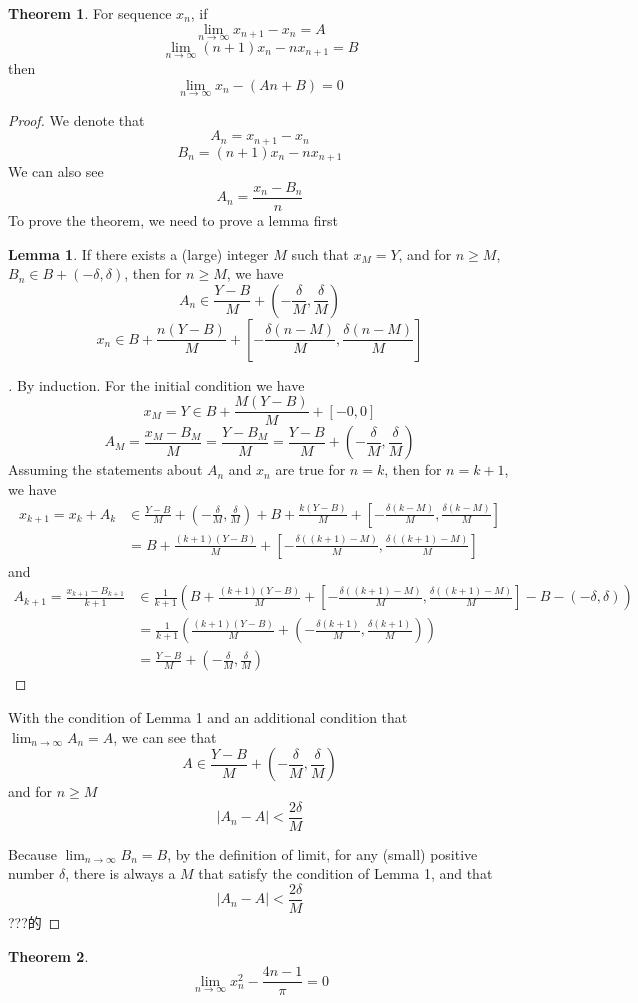 \documentclass[]{article}
\theoremstyle{definition}\newtheorem{theorem}{Theorem}
\theoremstyle{definition}\newtheorem{lemma}{Lemma}
\newenvironment{subproof}[1][\proofname]{%
  \renewcommand{\qedsymbol}{$\blacksquare$}%
  \begin{proof}[#1]%
}{%
  \end{proof}%
}
\begin{document}
\begin{theorem}
For sequence ${x_n}$, if
\[
\lim_{n\to\infty} x_{n+1} - x_n = A
\]
\[
\lim_{n\to\infty} (n+1)x_n - nx_{n+1} = B
\]
then
\[
\lim_{n\to\infty} x_n - (An+B) = 0
\]
\end{theorem}
\begin{proof}
We denote that
\[
A_n = x_{n+1} - x_n
\]
\[
B_n = (n+1)x_n - nx_{n+1}
\]
We can also see 
\[
A_n = \frac{x_n - B_n}{n}
\]
To prove the theorem, we need to prove a lemma first
\begin{lemma}
If there exists a (large) integer $M$ such that $x_M = Y$, and for $n\geq M$, $B_n \in B + (-\delta, \delta)$, then for $n\geq M$, we have
\[
A_n \in \frac{Y - B}{M} + \left(-\frac{\delta}{M}, \frac{\delta}{M}\right)
\]
\[
x_n \in B + \frac{n(Y - B)}{M} + \left[-\frac{\delta(n-M)}{M}, \frac{\delta(n-M)}{M}\right]
\]
\end{lemma}
\begin{subproof}
By induction. For the initial condition we have
\[
x_M = Y \in B + \frac{M(Y - B)}{M} + \left[-0, 0\right]
\]
\[
A_M = \frac{x_M - B_M}{M} = \frac{Y - B_M}{M} =  \frac{Y - B}{M} + \left(-\frac{\delta}{M}, \frac{\delta}{M}\right)
\]
Assuming the statements about $A_n$ and $x_n$ are true for $n = k$, then for $n = k + 1$, we have
\begin{align*}
x_{k+1} = x_{k} + A_{k} &\in \frac{Y - B}{M} + \left(-\frac{\delta}{M}, \frac{\delta}{M}\right) + B + \frac{k(Y - B)}{M} + \left[-\frac{\delta(k-M)}{M}, \frac{\delta(k-M)}{M}\right]\\
 &= B + \frac{(k + 1)(Y - B)}{M} + \left[-\frac{\delta((k+1)-M)}{M}, \frac{\delta((k+1)-M)}{M}\right]
\end{align*}
and
\begin{align*}
A_{k+1} = \frac{x_{k+1} - B_{k+1}}{k+1} &\in \frac{1}{k+1}\left(B + \frac{(k + 1)(Y - B)}{M} + \left[-\frac{\delta((k+1)-M)}{M}, \frac{\delta((k+1)-M)}{M}\right] - B - (-\delta, \delta)\right)\\
& = \frac{1}{k+1}\left(\frac{(k + 1)(Y - B)}{M} + \left(-\frac{\delta(k+1)}{M}, \frac{\delta(k+1)}{M}\right)  \right)\\
& = \frac{Y - B}{M} + \left(-\frac{\delta}{M}, \frac{\delta}{M}\right)
\end{align*}
\end{subproof}

With the condition of Lemma 1 and an additional condition that $\lim_{n\to\infty}A_n = A$, we can see that
\[
A \in \frac{Y - B}{M} + \left(-\frac{\delta}{M}, \frac{\delta}{M} \right) 
\]
and for $n \geq M$
\[
|A_n - A| < \frac{2\delta}{M}
\]

Because $\lim_{n\to\infty}B_n = B$, by the definition of limit, for any (small) positive number $\delta$, there is always a $M$ that satisfy the condition of Lemma 1, and that
\[
|A_n - A|  < \frac{2\delta}{M}
\]
???的

\end{proof}

\begin{theorem}
\[
\lim_{n\to\infty}x_n^2 - \frac{4n-1}{\pi} = 0
\]
\end{theorem}
\end{document}
